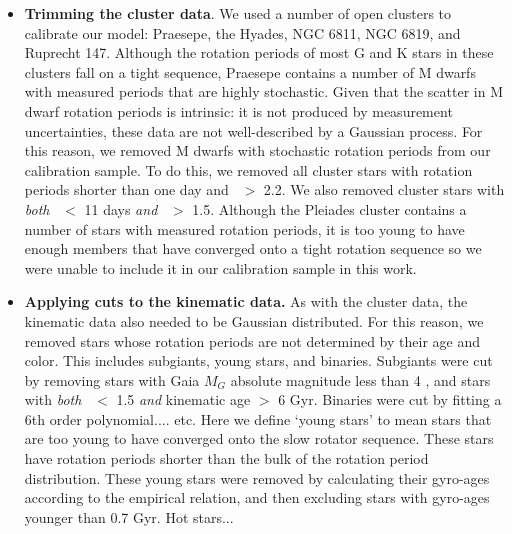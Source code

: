 \begin{itemize}
\item {\bf Trimming the cluster data}.
We used a number of open clusters to calibrate our model: Praesepe, the
Hyades, NGC 6811, NGC 6819, and Ruprecht 147.
Although the rotation periods of most G and K stars in these clusters fall on
a tight sequence, Praesepe contains a number of M dwarfs with measured periods
that are highly stochastic.
Given that the scatter in M dwarf rotation periods is intrinsic: it is not
produced by measurement uncertainties, these data are not well-described by a
Gaussian process.
For this reason, we removed M dwarfs with stochastic rotation periods from our
calibration sample.
To do this, we removed all cluster stars with rotation periods shorter than
        one day and \gcolor\ $>$ 2.2.
We also removed cluster stars with {\it both} \prot\ $<$ 11 days {\it and}
\gcolor\ $>$ 1.5.
Although the Pleiades cluster contains a number of stars with measured
rotation periods, it is too young to have enough members that have converged
onto a tight rotation sequence so we were unable to include it in our
calibration sample in this work.

\item {\bf Applying cuts to the kinematic data.}
As with the cluster data, the kinematic data also needed to be Gaussian
distributed.
For this reason, we removed stars whose rotation periods are not
determined by their age and color.
This includes subgiants, young stars, and binaries.
Subgiants were cut by removing stars with Gaia $M_G$ absolute magnitude less
than 4 , and stars with {\it both} \gcolor\ $<$ 1.5 {\it
and} kinematic age $>$ 6 Gyr.
Binaries were cut by fitting a 6th order polynomial.... etc.
Here we define `young stars' to mean stars that are too young to have
converged onto the slow rotator sequence.
These stars have rotation periods shorter than the bulk of the rotation period
distribution.
These young stars were removed by calculating their gyro-ages according to the
\citet{angus2019} empirical relation, and then excluding stars with gyro-ages
younger than 0.7 Gyr.
Hot stars...


\end{itemize}
